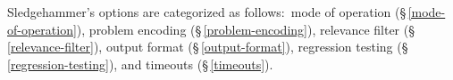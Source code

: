 \documentclass[a4paper,12pt]{article}
\let\oldS=\S
\def\S{\oldS\,}
\def\qtybf#1{$\mathbf{\left<\textbf{\textit{#1\/}}\right>}$}
\renewcommand\_{\hbox{\textunderscore\kern-.05ex}}
\begin{document}
\def\flushitem#1{\item[]\noindent\kern-\leftmargin \textbf{#1}}
\def\optrueonly#1{\flushitem{\textit{#1} $\bigl[$= \textit{true}$\bigr]$\enskip}\nopagebreak\\[\parskip]}
\def\optrue#1#2{\flushitem{\textit{#1} $\bigl[$= \qtybf{bool}$\bigr]$\enskip \defl\textit{true}\defr\hfill (neg.: \textit{#2})}\nopagebreak\\[\parskip]}
\def\opfalse#1#2{\flushitem{\textit{#1} $\bigl[$= \qtybf{bool}$\bigr]$\enskip \defl\textit{false}\defr\hfill (neg.: \textit{#2})}\nopagebreak\\[\parskip]}
\def\opsmart#1#2{\flushitem{\textit{#1} $\bigl[$= \qtybf{smart\_bool}$\bigr]$\enskip \defl\textit{smart}\defr\hfill (neg.: \textit{#2})}\nopagebreak\\[\parskip]}
\def\opsmartx#1#2{\flushitem{\textit{#1} $\bigl[$= \qtybf{smart\_bool}$\bigr]$\enskip \defl\textit{smart}\defr\\\hbox{}\hfill (neg.: \textit{#2})}\nopagebreak\\[\parskip]}
\def\opsmartfalse#1#2{\flushitem{\textit{#1} $\bigl[$= \qtybf{smart\_bool}$\bigr]$\enskip \defl\textit{false}\defr\hfill (neg.: \textit{#2})}\nopagebreak\\[\parskip]}
\def\opnodefault#1#2{\flushitem{\textit{#1} = \qtybf{#2}} \nopagebreak\\[\parskip]}
\def\opnodefaultbrk#1#2{\flushitem{$\bigl[$\textit{#1} =$\bigr]$ \qtybf{#2}} \nopagebreak\\[\parskip]}
\def\opdefault#1#2#3{\flushitem{\textit{#1} = \qtybf{#2}\enskip \defl\textit{#3}\defr} \nopagebreak\\[\parskip]}
\def\oparg#1#2#3{\flushitem{\textit{#1} \qtybf{#2} = \qtybf{#3}} \nopagebreak\\[\parskip]}
\def\opargbool#1#2#3{\flushitem{\textit{#1} \qtybf{#2} $\bigl[$= \qtybf{bool}$\bigr]$\hfill (neg.: \textit{#3})}\nopagebreak\\[\parskip]}
\def\opargboolorsmart#1#2#3{\flushitem{\textit{#1} \qtybf{#2} $\bigl[$= \qtybf{smart\_bool}$\bigr]$\hfill (neg.: \textit{#3})}\nopagebreak\\[\parskip]}

Sledgehammer's options are categorized as follows:\ mode of operation
(\S\ref{mode-of-operation}), problem encoding (\S\ref{problem-encoding}),
relevance filter (\S\ref{relevance-filter}), output format
(\S\ref{output-format}), regression testing (\S\ref{regression-testing}),
and timeouts (\S\ref{timeouts}).
\end{document}
